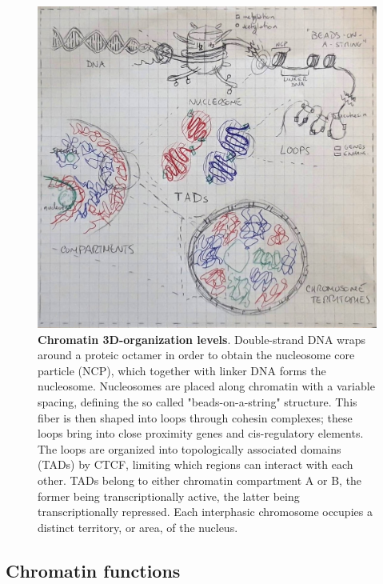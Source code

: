 \begin{figure}[ht]
  \centering
  \includegraphics[width=1\textwidth]{chromatin_organization.jpeg}
  \caption{\textbf{Chromatin 3D-organization levels}. Double-strand DNA wraps around a proteic octamer in order to obtain the nucleosome core particle (NCP), which together with linker DNA forms the nucleosome. Nucleosomes are placed along chromatin with a variable spacing, defining the so called "beads-on-a-string" structure. This fiber is then shaped into loops through cohesin complexes; these loops bring into close proximity genes and cis-regulatory elements. The loops are organized into topologically associated domains (TADs) by CTCF, limiting which regions can interact with each other. TADs belong to either chromatin compartment A or B, the former being transcriptionally active, the latter being transcriptionally repressed. Each interphasic chromosome occupies a distinct territory, or area, of the nucleus.}
  \label{fig:chromatin}
\end{figure}

\subsection{Chromatin functions}

